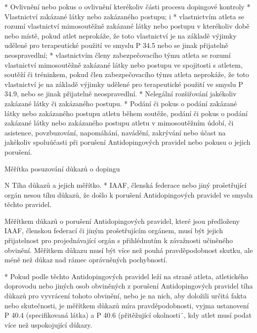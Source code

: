   * Ovlivnění nebo pokus o ovlivnění kterékoliv části procesu dopingové kontroly
  * Vlastnictví zakázané látky nebo zakázaného postupu;
    \begitems \style i
    * vlastnictvím atleta se rozumí vlastnictví mimosoutěžně zakázané látky nebo postupu v kterékoliv době nebo místě, pokud atlet neprokáže, že toto vlastnictví je na základě výjimky udělené pro terapeutické použití ve smyslu P 34.5 nebo se jinak přijatelně neospravedlní;
    * vlastnictvím členy zabezpečovacího týmu atleta se rozumí vlastnictví mimosoutěžně zakázané látky nebo postupu ve spojitosti s atletem, soutěží či tréninkem, pokud člen zabezpečovacího týmu atleta neprokáže, že toto vlastnictví je na základě výjimky udělené pro terapeutické použití ve smyslu P 34.9, nebo se jinak přijatelně neospravedlní.
    \enditems
  * Nelegální rozšiřování jakékoliv zakázané látky či zakázaného postupu.
  * Podání či pokus o podání zakázané látky nebo zakázaného postupu atletu během soutěže, podání či pokus o podání zakázané látky nebo zakázaného postupu atletu v mimosoutěžním údobí, či asistence, povzbuzování, napomáhání, navádění, zakrývání nebo účast na jakékoliv spoluúčasti při porušení Antidopingových pravidel nebo pokusu o jejich porušení.
  \enditems
\enditems

\secc Měřítka posuzování důkazů o dopingu

\begitems \style N
Tíha důkazů a jejich měřítko.
* IAAF, členská federace nebo jiný prošetřující orgán nesou tíhu důkazů, že došlo k porušení Antidopingových pravidel ve smyslu těchto pravidel.

Měřítkem důkazů o porušení Antidopingových pravidel, které jsou předloženy IAAF, členskou federací či jiným prošetřujícím orgánem, musí být jejich přijatelnost pro projednávající orgán s přihlédnutím k závažnosti učiněného obvinění. Měřítkem důkazu musí být více než pouhá pravděpodobnost skutku, ale méně než důkaz nad rámec oprávněných pochybností.

* Pokud podle těchto Antidopingových pravidel leží na straně atleta, atletického doprovodu nebo jiných osob obviněných z porušení Antidopingových pravidel tíha důkazů pro vyvrácení tohoto obvinění, nebo je na nich, aby doložili určitá fakta nebo skutečnosti, je měřítkem důkazů míra pravděpodobnosti, vyjma ustanovení P 40.4 (specifikovaná látka) a P 40.6 (přitěžující okolnosti¨, kdy atlet musí podat více než uspokojující důkazy.

